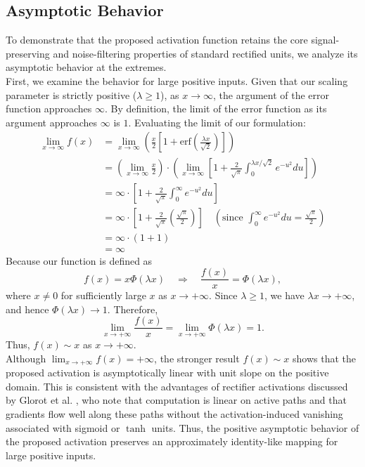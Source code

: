 \documentclass[11pt]{article}
\begin{document}
\subsection{Asymptotic Behavior}
\noindent To demonstrate that the proposed activation function retains the core signal-preserving and noise-filtering properties of standard rectified units, we analyze its asymptotic behavior at the extremes.\\ 

\noindent First, we examine the behavior for large positive inputs. Given that our scaling parameter is strictly positive ($\lambda \geq 1$), as $x \to \infty$, the argument of the error function approaches $\infty$. By definition, the limit of the error function as its argument approaches $\infty$ is $1$. Evaluating the limit of our formulation:
\begin{align*}
\lim_{x \to \infty} f(x) &= \lim_{x \to \infty} \left( \frac{x}{2} \left[ 1 + \text{erf}\left( \frac{\lambda x}{\sqrt{2}} \right) \right] \right) \\
&= \left( \lim_{x \to \infty} \frac{x}{2} \right) \cdot \left( \lim_{x \to \infty} \left[ 1 + \frac{2}{\sqrt{\pi}} \int_{0}^{\lambda x / \sqrt{2}} e^{-u^2} du \right] \right) \\
&= \infty \cdot \left[ 1 + \frac{2}{\sqrt{\pi}} \int_{0}^{\infty} e^{-u^2} du \right] \\
&= \infty \cdot \left[ 1 + \frac{2}{\sqrt{\pi}} \left( \frac{\sqrt{\pi}}{2} \right) \right] \quad \left(\text{since } \int_{0}^{\infty} e^{-u^2} du = \frac{\sqrt{\pi}}{2}\right) \\
&= \infty \cdot (1 + 1) \\
&= \infty
\end{align*}
\noindent Because our function is defined as 
\begin{equation*}
f(x) = x\Phi(\lambda x)
\quad\Longrightarrow\quad
\frac{f(x)}{x} = \Phi(\lambda x),
\end{equation*}
where $x \neq 0$ for sufficiently large $x$ as $x \rightarrow +\infty$.
Since $\lambda \geq 1$, we have $\lambda x \rightarrow +\infty$, and hence
$\Phi(\lambda x) \rightarrow 1$. Therefore,
\begin{equation*}
\lim_{x\rightarrow +\infty}\frac{f(x)}{x}
=
\lim_{x\rightarrow +\infty}\Phi(\lambda x)
= 1.
\end{equation*}
Thus, $f(x) \sim x$ as $x \rightarrow +\infty$.\\

\noindent Although $\lim_{x\rightarrow+\infty}f(x)=+\infty$, the stronger result
$f(x)\sim x$ shows that the proposed activation is asymptotically linear
with unit slope on the positive domain. This is consistent with the
advantages of rectifier activations discussed by Glorot et al.
\cite{pmlr-v15-glorot11a}, who note that computation is linear on active
paths and that gradients flow well along these paths without the
activation-induced vanishing associated with sigmoid or $\tanh$ units.
Thus, the positive asymptotic behavior of the proposed activation
preserves an approximately identity-like mapping for large positive
inputs.\\
\end{document}
